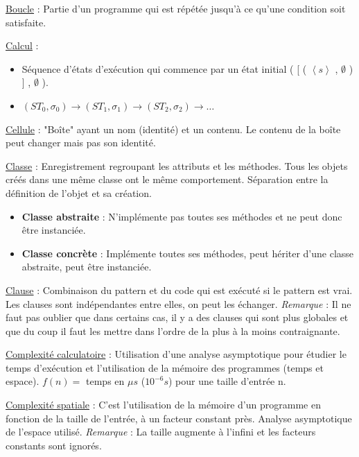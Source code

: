 \documentclass[fr,license=none]{../../../eplsummary}
\begin{document}
\begin{flushleft}
\textcolor{mauvedef}{\underline{Boucle}} : Partie d'un programme qui est répétée jusqu'à ce qu'une condition soit satisfaite. \bigbreak

\textcolor{mauvedef}{\underline{Calcul}} :

\begin{itemize}
\item Séquence d’états d’exécution qui commence par un état initial \textcolor{miorangerouge}{( [ ( $\left\langle s \right\rangle$ , $\emptyset$ ) ] , $\emptyset$ )}.
\item \textcolor{miorangerouge}{$ (ST_{0} , \sigma_{0}) \rightarrow (ST_{1} , \sigma_{1}) \rightarrow (ST_{2} , \sigma_{2})  \rightarrow   \ldots  $}
\end{itemize} \bigbreak


\textcolor{mauvedef}{\underline{Cellule}} : "Boîte" ayant un nom (identité) et un contenu. Le contenu de la boîte peut changer mais pas son identité. \bigbreak


\textcolor{mauvedef}{\underline{Classe}} : Enregistrement regroupant les attributs et les méthodes. Tous les objets créés dans une même classe ont le même comportement. Séparation entre la définition de l'objet et sa création.
	
\begin{itemize}
\item \textbf{Classe abstraite} : N'implémente pas toutes ses méthodes et ne peut donc être instanciée.
\item \textbf{Classe concrète} : Implémente toutes ses méthodes, peut hériter d’une classe abstraite, peut être instanciée.
\end{itemize}
\bigbreak


\textcolor{mauvedef}{\underline{Clause}} : Combinaison du pattern et du code qui est exécuté si le pattern est vrai. Les clauses sont indépendantes entre elles, on peut les échanger. \textit{Remarque} : Il ne faut pas oublier que dans certains cas, il y a des clauses qui sont plus globales et que du coup il faut les mettre dans l'ordre de la plus à la moins contraignante. \bigbreak


\textcolor{mauvedef}{\underline{Complexité calculatoire}} : Utilisation d'une analyse asymptotique pour étudier le temps d'exécution et l'utilisation de la mémoire des programmes (temps et espace). $f(n) =$ temps en $\mu s$ ($10^{-6} s$) pour une taille d'entrée n.
\bigbreak


\textcolor{mauvedef}{\underline{Complexité spatiale}} : C’est l'utilisation de la mémoire d’un programme en fonction de la taille de l’entrée, à un facteur constant près. Analyse asymptotique de l'espace utilisé. \textit{Remarque} : La taille augmente à l'infini et les facteurs constants sont ignorés.


\end{flushleft}
\end{document}
